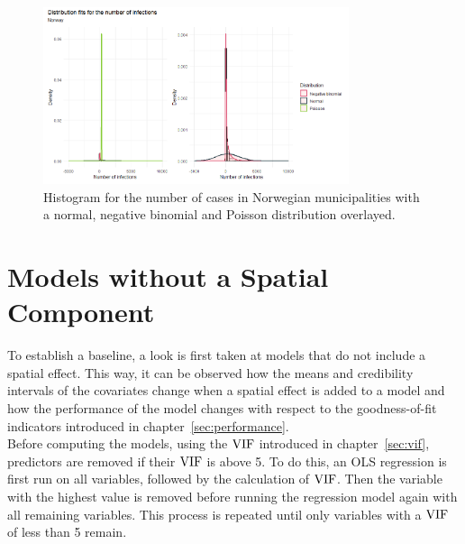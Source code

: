 %         
\begin{figure}[H]
    \centering
    \includegraphics[width = 0.8\textwidth]{distrfit_norway.png}
    \caption{Histogram for the number of cases in Norwegian municipalities with a normal, negative binomial and Poisson distribution overlayed.}
    \label{fitDistrNorway}
\end{figure}
\clearpage
\section{Models without a Spatial Component}
To establish a baseline, a look is first taken at models that do not include a spatial effect. This way, it can be observed how the means and credibility intervals of the covariates change when a spatial effect is added to a model and how the performance of the model changes with respect to the goodness-of-fit indicators introduced in chapter~\ref{sec:performance}. \\
Before computing the models, using the $\hbox{VIF}$ introduced in chapter~\ref{sec:vif}, predictors are removed if their $\hbox{VIF}$ is above 5. To do this, an OLS regression is first run on all variables, followed by the calculation of $\hbox{VIF}$. Then the variable with the highest value is removed before running the regression model again with all remaining variables. This process is repeated until only variables with a $\hbox{VIF}$ of less than 5 remain. 

